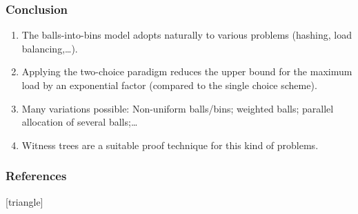 \documentclass[professionalfonts]{beamer}
\begin{document}
\begin{frame}
\frametitle{Conclusion}
\begin{enumerate}
\item The balls-into-bins model \alert{adopts naturally} to various problems (hashing, load balancing,\dots).
\item Applying the two-choice paradigm reduces the upper bound for the maximum load by an \alert{exponential factor} (compared to the single choice scheme).
\item \alert{Many variations} possible: Non-uniform balls/bins; weighted balls; parallel allocation of several balls;\dots
\item \alert{Witness trees} are a suitable proof technique for this kind of problems.
\end{enumerate}
\end{frame}

\begin{frame}
\frametitle{References}
\nocite{VOC03}
\nocite{ABKU99}
\nocite{RS98}
\nocite{BCSV06}
\nocite{capocelli1990generalized}
[triangle]
\printbibliography[keyword=main]
\bigskip

\printbibliography[notkeyword=main]
\end{frame}
\end{document}
